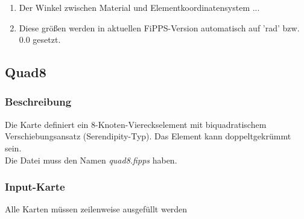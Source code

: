 \documentclass[11pt,titlepage,listof=totoc,bibliography=totoc,twoside]{scrreprt}
\begin{document}
{{\begin{enumerate}
\item Der Winkel zwischen Material und Elementkoordinatensystem ...
\item Diese größen werden in aktuellen FiPPS-Version automatisch auf 'rad' bzw. 0.0 gesetzt.
\end{enumerate}

\newpage

\subsection{Quad8}

\subsubsection{Beschreibung}

Die Karte definiert ein 8-Knoten-Viereckselement mit biquadratischem Verschiebungsansatz (Serendipity-Typ). Das Element kann doppeltgekrümmt sein.\\
Die Datei muss den Namen \emph{quad8.fipps} haben.

\subsubsection{Input-Karte}

Alle Karten müssen zeilenweise ausgefüllt werden

}}
\end{document}
